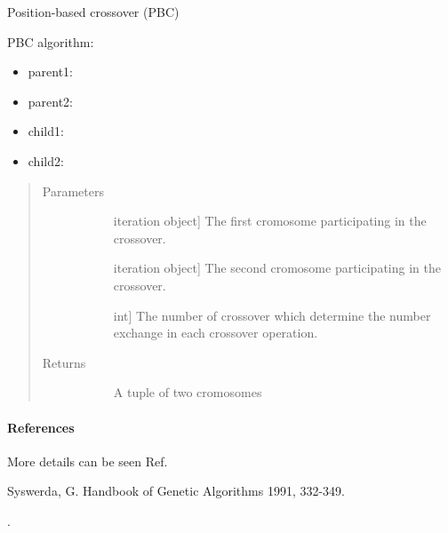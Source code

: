 \documentclass[letterpaper,10pt,english]{sphinxmanual}
\begin{document}
\begin{fulllineitems}
\label{\detokenize{pygace:pygace.ga.position_based_crossover}}
Position-based crossover (PBC)

PBC algorithm:
\begin{itemize}
\item {} 
parent1: 

\item {} 
parent2: 

\item {} 
child1: 

\item {} 
child2: 

\end{itemize}
\begin{quote}\begin{description}
\item[{Parameters}] \leavevmode\begin{description}
\item[{}] \leavevmode{[}iteration object{]}
The first cromosome participating in the crossover.

\item[{}] \leavevmode{[}iteration object{]}
The second cromosome participating in the crossover.

\item[{}] \leavevmode{[}int{]}
The number of crossover which determine the number exchange in each
crossover operation.

\end{description}

\item[{Returns}] \leavevmode\begin{description}
\item[{}] \leavevmode
A tuple of two cromosomes

\end{description}

\end{description}\end{quote}
\paragraph{References}

More details can be seen Ref. %
\begin{footnote}[5]\sphinxAtStartFootnote
Syswerda, G. Handbook of Genetic Algorithms 1991, 332-349.
%
\end{footnote}.

\end{fulllineitems}
\end{document}
